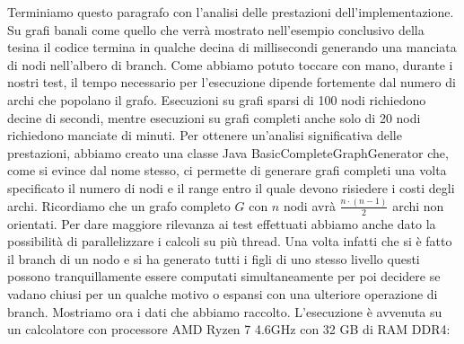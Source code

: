 \documentclass[
	article,			%
	12pt,				%
	oneside,			%
	a4paper,			%
	english,			%
	italian,				%
	sumario=tradicional,
	]{abntex2}
\begin{document}
Terminiamo questo paragrafo con l'analisi delle prestazioni dell'implementazione. Su grafi banali come quello che verrà mostrato nell'esempio conclusivo della tesina il codice termina in qualche decina di millisecondi generando una manciata di nodi nell'albero di branch. Come abbiamo potuto toccare con mano, durante i nostri test, il tempo necessario per l'esecuzione dipende fortemente dal numero di archi che popolano il grafo. Esecuzioni su grafi sparsi di 100 nodi richiedono decine di secondi, mentre esecuzioni su grafi completi anche solo di 20 nodi richiedono manciate di minuti. Per ottenere un'analisi significativa delle prestazioni, abbiamo creato una classe Java {\selectfont BasicCompleteGraphGenerator} che, come si evince dal nome stesso, ci permette di generare grafi completi una volta specificato il numero di nodi e il range entro il quale devono risiedere i costi degli archi. Ricordiamo che un grafo completo $G$ con $n$ nodi avrà $\frac{n\cdot (n-1)}{2}$ archi non orientati. Per dare maggiore rilevanza ai test effettuati abbiamo anche dato la possibilità di parallelizzare i calcoli su più thread. Una volta infatti che si è fatto il branch di un nodo e si ha generato tutti i figli di uno stesso livello questi possono tranquillamente essere computati simultaneamente per poi decidere se vadano chiusi per un qualche motivo o espansi con una ulteriore operazione di branch.
\newline
Mostriamo ora i dati che abbiamo raccolto. L'esecuzione è avvenuta su un calcolatore con processore AMD Ryzen 7 4.6GHz con 32 GB di RAM DDR4:
\end{document}
